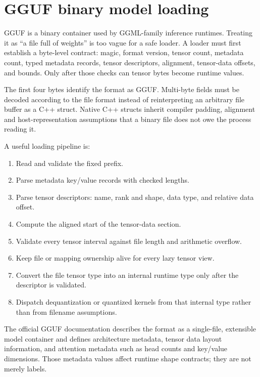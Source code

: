 \hypertarget{appendix-fef72dd246f2}{}\label{referencestart:appendix-fef72dd246f2}
\section{GGUF binary model loading}\label{appendix-fef72dd246f2-gguf-binary-model-loading}

\hypertarget{appendix-fef72dd246f2-gguf-binary-model-loading}{}

GGUF is a binary container used by GGML-family inference runtimes. Treating it as ``a file full of weights'' is too vague for a safe loader. A loader must first establish a byte-level contract: magic, format version, tensor count, metadata count, typed metadata records, tensor descriptors, alignment, tensor-data offsets, and bounds. Only after those checks can tensor bytes become runtime values.

The first four bytes identify the format as GGUF. Multi-byte fields must be decoded according to the file format instead of reinterpreting an arbitrary file buffer as a C++ struct. Native C++ structs inherit compiler padding, alignment and host-representation assumptions that a binary file does not owe the process reading it.

A useful loading pipeline is:

\begin{enumerate}
\def\labelenumi{\arabic{enumi}.}
\tightlist
\item
  Read and validate the fixed prefix.
\item
  Parse metadata key/value records with checked lengths.
\item
  Parse tensor descriptors: name, rank and shape, data type, and relative data offset.
\item
  Compute the aligned start of the tensor-data section.
\item
  Validate every tensor interval against file length and arithmetic overflow.
\item
  Keep file or mapping ownership alive for every lazy tensor view.
\item
  Convert the file tensor type into an internal runtime type only after the descriptor is validated.
\item
  Dispatch dequantization or quantized kernels from that internal type rather than from filename assumptions.
\end{enumerate}

The official GGUF documentation describes the format as a single-file, extensible model container and defines architecture metadata, tensor data layout information, and attention metadata such as head counts and key/value dimensions. Those metadata values affect runtime shape contracts; they are not merely labels.

